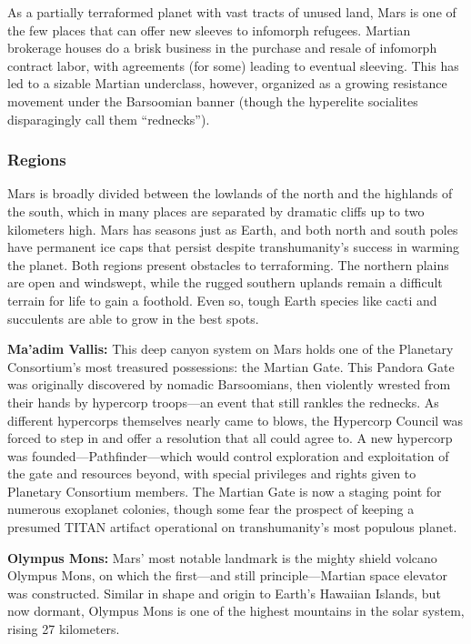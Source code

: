 As a partially terraformed planet with vast tracts of 
unused land, Mars is one of the few places that can 
offer new sleeves to infomorph refugees. Martian brokerage
houses do a brisk business in the purchase and
resale of infomorph contract labor, with agreements 
(for some) leading to eventual sleeving. This has led to 
a sizable Martian underclass, however, organized as a 
growing resistance movement under the Barsoomian 
banner (though the hyperelite socialites disparagingly 
call them ``rednecks'').

\subsubsection{Regions}

Mars is broadly divided between the lowlands of the 
north and the highlands of the south, which in many 
places are separated by dramatic cliffs up to two kilometers
high. Mars has seasons just as Earth, and both
north and south poles have permanent ice caps that 
persist despite transhumanity's success in warming the 
planet. Both regions present obstacles to terraforming. 
The northern plains are open and windswept, while 
the rugged southern uplands remain a difficult terrain 
for life to gain a foothold. Even so, tough Earth species
like cacti and succulents are able to grow in the
best spots.

\textbf{Ma'adim Vallis:} This deep canyon system on 
Mars holds one of the Planetary Consortium's most 
treasured possessions: the Martian Gate. This Pandora
Gate was originally discovered by nomadic
Barsoomians, then violently wrested from their hands 
by hypercorp troops—an event that still rankles the 
rednecks. As different hypercorps themselves nearly 
came to blows, the Hypercorp Council was forced to 
step in and offer a resolution that all could agree to. 
A new hypercorp was founded—Pathfinder—which 
would control exploration and exploitation of the 
gate and resources beyond, with special privileges and 
rights given to Planetary Consortium members. The 
Martian Gate is now a staging point for numerous 
exoplanet colonies, though some fear the prospect of 
keeping a presumed TITAN artifact operational on 
transhumanity's most populous planet.

\textbf{Olympus Mons:} Mars' most notable landmark is 
the mighty shield volcano Olympus Mons, on which 
the first—and still principle—Martian space elevator 
was constructed. Similar in shape and origin to Earth's 
Hawaiian Islands, but now dormant, Olympus Mons 
is one of the highest mountains in the solar system, 
rising 27 kilometers.

